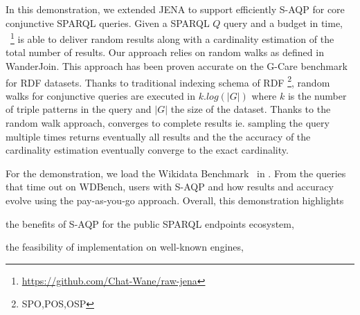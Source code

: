   In this demonstration, we extended JENA to support efficiently
  S-AQP for core conjunctive
  SPARQL queries.  Given a SPARQL $Q$ query and a budget in time,
  \NAME~\footnote{\url{https://github.com/Chat-Wane/raw-jena}} is able
  to deliver random results along with a cardinality estimation of the
  total number of results. Our approach relies on random
 walks as defined in WanderJoin\cite{li2016wanderjoin}. This approach
 has been proven accurate on the G-Care
 benchmark\cite{DBLP:conf/sigmod/ParkKBKHH20} for RDF datasets. Thanks
 to traditional indexing schema of RDF \footnote{SPO,POS,OSP}, random
 walks for conjunctive queries are executed in $k.log(|G|)$ where
 $k$ is the number of triple patterns in the query and $|G|$ the size
 of the dataset. Thanks to the random walk approach, \NAME converges
 to complete results ie. sampling the query multiple times returns
  eventually all results  and the  the accuracy of the cardinality
  estimation eventually converge to the exact cardinality.


\noindent For the demonstration, we load the Wikidata
Benchmark~\cite{angles2022wdbench} in \NAME. From the queries that
time out on WDBench, users  with S-AQP
and how results and accuracy evolve using the pay-as-you-go approach.
Overall, this demonstration highlights
\begin{inparaenum}[(i)]
\item the benefits of S-AQP for the public SPARQL endpoints ecosystem,
\item the feasibility of implementation on well-known engines,
\end{inparaenum}



